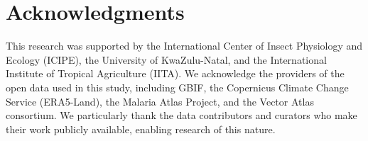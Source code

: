 \documentclass{article}
\begin{document}
\section*{Acknowledgments}
\par
This research was supported by the International Center of Insect Physiology and Ecology (ICIPE), the University 
of KwaZulu-Natal, and the International Institute of Tropical Agriculture (IITA). We acknowledge the providers of 
the open data used in this study, including GBIF, the Copernicus Climate Change Service (ERA5-Land), the Malaria 
Atlas Project, and the Vector Atlas consortium. We particularly thank the data contributors and curators who make 
their work publicly available, enabling research of this nature.



\end{document}
